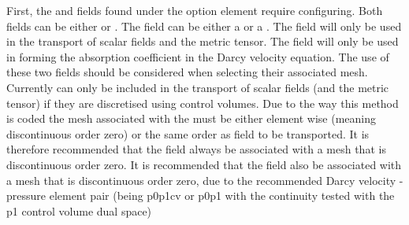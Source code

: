 First, the  and  fields found under the option element  require configuring. Both fields can be either  or . The  field can be either a  or a . The  field will only be used in the transport of scalar fields and the metric tensor. The  field will only be used in forming the absorption coefficient in the Darcy velocity equation. The use of these two fields should be considered when selecting their associated mesh. Currently  can only be included in the transport of scalar fields (and the metric tensor) if they are discretised using control volumes. Due to the way this method is coded the mesh associated with the  must be either element wise (meaning discontinuous order zero) or the same order as field to be transported. It is therefore recommended that the  field always be associated with a mesh that is discontinuous order zero. It is recommended that the  field also be associated with a mesh that is discontinuous order zero, due to the recommended Darcy velocity - pressure element pair (being p0p1cv or p0p1 with the continuity tested with the p1 control volume dual space)

